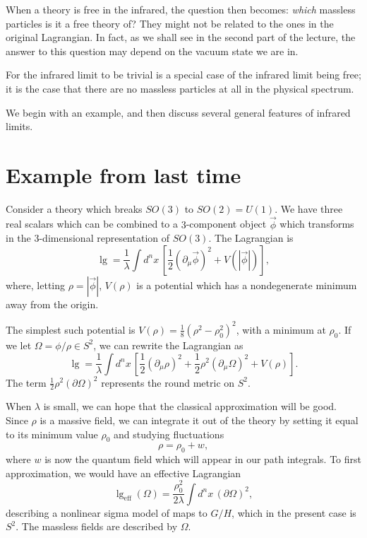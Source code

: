 When a theory is free in the infrared, the question then becomes: {\it
which}\/ massless particles is it a free theory of?  They might not be related
to the ones in the original Lagrangian.  In fact, as we shall see in the second
part of the lecture,
the answer to this
question may depend on the vacuum state we are in.

For the infrared limit to be trivial is a special case of the infrared limit
being free; it is the case that there are no massless particles at all in the
physical spectrum.  


We begin with an example, and then discuss several general features of infrared
limits.

\section{Example from last time}

Consider a theory which breaks $SO(3)$ to $SO(2)=U(1)$.  We have three real
scalars which can be combined to a $3$-component object
$\vec{\phi}$ which transforms in the
$3$-dimensional representation of $SO(3)$.  The Lagrangian is
$$\lg=\frac1{\lambda}\int
d^nx\,\left[\frac12(\partial_\mu\vec{\phi})^2+V(|\vec{\phi}|)\right],$$
where, letting $\rho=|\vec{\phi}|$, $V(\rho)$ is a potential which has a
nondegenerate minimum away from the origin.  

\centerline{\epsfxsize=1in}
\centerline{\quad}

\noindent
The simplest such potential is $V(\rho)=\frac18(\rho^2-\rho_0^2)^2$, with a
minimum at $\rho_0$.  If we let
 $\Omega=\phi/\rho\in S^2$, we can rewrite the Lagrangian as
$$\lg=\frac1{\lambda}\int
d^nx\, \left[\frac12(\partial_\mu\rho)^2 +\frac12\rho^2(\partial_\mu\Omega)^2
+V(\rho)\right].$$ 
The term $\frac12\rho^2(\partial\Omega)^2$ represents the round metric on
$S^2$.

When $\lambda$ is small, we can hope that the classical approximation will be
good.  Since $\rho$ is a massive field, we can integrate it out of the theory
by setting it equal to its minimum value $\rho_0$ and studying fluctuations
$$\rho=\rho_0+w,$$
 where $w$ is now
the quantum field which will appear in our path integrals.
To first approximation, we would have an effective Lagrangian
$$\lg_{\text{eff}}(\Omega)=\frac{\rho_0^2}{2\lambda}\int
d^nx\,(\partial\Omega)^2,$$ 
describing
a nonlinear sigma model of maps to $G/H$, which in the present case is $S^2$. 
The massless fields are described by $\Omega$.   

